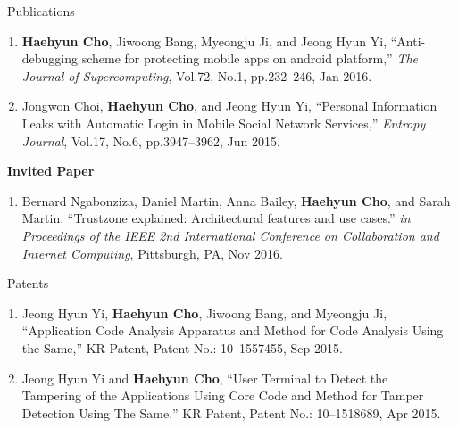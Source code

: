 \documentclass{resume} %
\begin{document}
\begin{rSection}{\faGenderless~Publications}
\begin{enumerate}[leftmargin=0pt]
		\item \textbf{Haehyun Cho}, Jiwoong Bang, Myeongju Ji, and Jeong Hyun Yi, 
		``Anti-debugging scheme for protecting mobile apps on android platform,'' 
		\emph{The Journal of Supercomputing}, 
		Vol.72, No.1, pp.232--246, Jan 2016.

		\item Jongwon Choi, \textbf{Haehyun Cho}, and Jeong Hyun Yi, 
		``Personal Information Leaks with Automatic Login in Mobile Social Network Services,'' 
		\emph{Entropy Journal}, 
		Vol.17, No.6, pp.3947--3962, Jun 2015.
	\end{enumerate}

    \vspace{3mm}
   
    \strut\textbullet~{\bf Invited Paper}
    \begin{enumerate}[leftmargin=0pt]
        \item Bernard Ngabonziza, Daniel Martin, Anna Bailey, \textbf{Haehyun Cho}, and Sarah Martin.
        ``Trustzone explained: Architectural features and use cases.''
        \emph{in Proceedings of the IEEE 2nd International Conference on Collaboration and Internet Computing}, 
        Pittsburgh, PA, Nov 2016.    
    \end{enumerate}

	\vspace{3mm}
\end{rSection}

\begin{rSection}{\faGenderless~Patents}
	
    \begin{enumerate}[leftmargin=0pt]
		\item Jeong Hyun Yi, \textbf{Haehyun Cho}, Jiwoong Bang, and Myeongju Ji,
		``Application Code Analysis Apparatus and Method for Code Analysis Using the Same,'' KR Patent, 
		Patent No.: 10--1557455, Sep 2015.

		\item Jeong Hyun Yi and \textbf{Haehyun Cho}, 
		``User Terminal to Detect the Tampering of the Applications Using Core Code and Method for Tamper Detection Using The Same,'' KR Patent, 
		Patent No.: 10--1518689, Apr 2015.
	\end{enumerate}
	
	\vspace{3mm}
\end{rSection}
\end{document}
